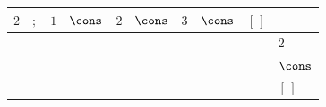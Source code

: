 {\scriptsize\setlength{\tabcolsep}{1.5pt}%
\begin{tabular}{ccccccccc|l}
$\text{2}$ & $;$ & $\text{1}$ & $\cons$ & $\text{2}$ & $\cons$ & $\text{3}$ & $\cons$ & $[\,]$ & \\ \hline
\gcell{$\posC{\circ}$} & \gcell{$$} & \gcell{$\posC{\circ}$} & \gcell{$\posC{\circ}$} & \gcell{$\posD{\bullet}$} & \gcell{$\posC{\circ}$} & \gcell{$$} & \gcell{$$} & \gcell{$$} & $\text{2}$ \\
\gcell{$\posC{\circ}$} & \gcell{$$} & \gcell{$\posC{\circ}$} & \gcell{$\posC{\circ}$} & \gcell{$\posC{\circ}$} & \gcell{$\posC{\circ}$} & \gcell{$$} & \gcell{$$} & \gcell{$$} & $\cons$ \\
\gcell{$\posC{\circ}$} & \gcell{$$} & \gcell{$\posC{\circ}$} & \gcell{$\posC{\circ}$} & \gcell{$\posC{\circ}$} & \gcell{$\posC{\circ}$} & \gcell{$\posC{\circ}$} & \gcell{$\posC{\circ}$} & \gcell{$\posC{\circ}$} & $[\,]$ \\
\end{tabular}}

